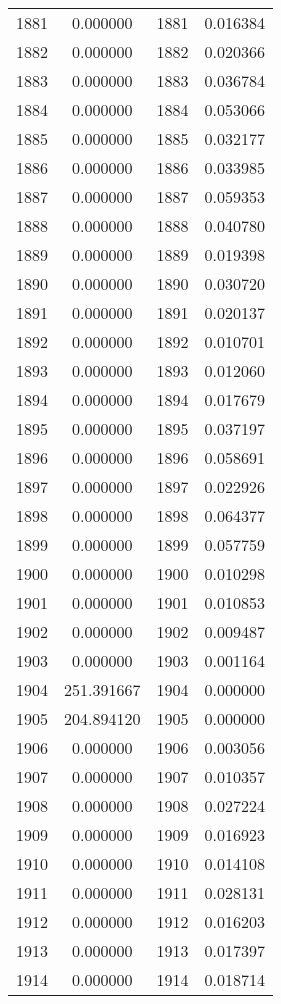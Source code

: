 \documentclass[12pt]{article}
\begin{document}
\begin{longtable}{@{}cccc@{}}
1881 & 0.000000 & 1881 & 0.016384 \\
1882 & 0.000000 & 1882 & 0.020366 \\
1883 & 0.000000 & 1883 & 0.036784 \\
1884 & 0.000000 & 1884 & 0.053066 \\
1885 & 0.000000 & 1885 & 0.032177 \\
1886 & 0.000000 & 1886 & 0.033985 \\
1887 & 0.000000 & 1887 & 0.059353 \\
1888 & 0.000000 & 1888 & 0.040780 \\
1889 & 0.000000 & 1889 & 0.019398 \\
1890 & 0.000000 & 1890 & 0.030720 \\
1891 & 0.000000 & 1891 & 0.020137 \\
1892 & 0.000000 & 1892 & 0.010701 \\
1893 & 0.000000 & 1893 & 0.012060 \\
1894 & 0.000000 & 1894 & 0.017679 \\
1895 & 0.000000 & 1895 & 0.037197 \\
1896 & 0.000000 & 1896 & 0.058691 \\
1897 & 0.000000 & 1897 & 0.022926 \\
1898 & 0.000000 & 1898 & 0.064377 \\
1899 & 0.000000 & 1899 & 0.057759 \\
1900 & 0.000000 & 1900 & 0.010298 \\
1901 & 0.000000 & 1901 & 0.010853 \\
1902 & 0.000000 & 1902 & 0.009487 \\
1903 & 0.000000 & 1903 & 0.001164 \\
1904 & 251.391667 & 1904 & 0.000000 \\
1905 & 204.894120 & 1905 & 0.000000 \\
1906 & 0.000000 & 1906 & 0.003056 \\
1907 & 0.000000 & 1907 & 0.010357 \\
1908 & 0.000000 & 1908 & 0.027224 \\
1909 & 0.000000 & 1909 & 0.016923 \\
1910 & 0.000000 & 1910 & 0.014108 \\
1911 & 0.000000 & 1911 & 0.028131 \\
1912 & 0.000000 & 1912 & 0.016203 \\
1913 & 0.000000 & 1913 & 0.017397 \\
1914 & 0.000000 & 1914 & 0.018714 \\

\end{longtable}
\end{document}
